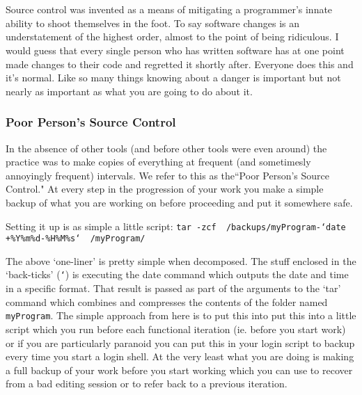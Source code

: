 \chapter[Source Control]{}

Source control was invented as a means of mitigating a programmer's innate ability to shoot themselves in the foot.
To say software changes is an understatement of the highest order, almost to the point of being ridiculous.  I would
guess that every single person who has written software has at one point made changes to their code and regretted it 
shortly after.  Everyone does this and it's normal.  Like so many things knowing about a danger is important but not 
nearly as important as what you are going to do about it.

\subsection{Poor Person's Source Control}{}

In the absence of other tools (and before other tools were even around) the practice was to make copies of everything
at frequent (and sometimesly annoyingly frequent) intervals.  We refer to this as the``Poor Person's Source Control."
At every step in the progression of your work you make a simple backup of what you are working on before proceeding and
put it somewhere safe.

Setting it up is as simple a little script:
	{\tt tar -zcf ~/backups/myProgram-`date +\%Y\%m\%d-\%H\%M\%s` ~/myProgram/}

The above `one-liner' is pretty simple when decomposed.  The stuff enclosed in the
`back-ticks' ({\tt `}) is executing the date command which outputs the date and time
in a specific format.  That result is passed as part of the arguments to the `tar'
command which combines and compresses the contents of the folder named {\tt myProgram}. 
The simple approach from here is to put this
into put this into a little script which you run before each functional iteration
(ie. before you start work) or if you are particularly paranoid you can put this
in your login script to backup every time you start a login shell.  At the very least
what you are doing is making a full backup of your work before you start working
which you can use to recover from a bad editing
session or to refer back to a previous iteration.
